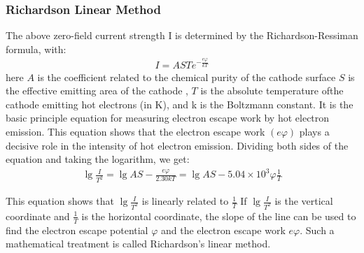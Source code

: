 \documentclass[UTF8]{article}
\begin{document}
   \subsubsection{Richardson Linear Method}
   The above zero-field current strength I is determined by the Richardson-Ressiman formula, with:
   \begin{eqnarray}
   I=A S T e^{-\frac{e \varphi}{k T}}
   \end{eqnarray}
   here $A$ is the coefficient related to the chemical purity of the cathode surface  $S$ is the effective emitting area of the cathode , $T$ is the absolute temperature ofthe cathode emitting hot electrons (in K), and k is the Boltzmann constant. It is the basic principle equation for measuring electron escape work by hot electron emission. This equation shows that the electron escape work $( e\varphi )$ plays a decisive role in the intensity of hot electron emission. Dividing both sides of the equation and taking the logarithm, we get:
   \begin{eqnarray}
   \lg \frac{I}{T^{2}}=\lg A S-\frac{e \varphi}{2.30 k T}=\lg A S-5.04 \times 10^{3} \varphi \frac{1}{T}
   \end{eqnarray}
   
   This equation shows that $\lg \frac{I}{T^{2}}$ is linearly related to $\frac{1}{T}$ If $\lg \frac{I}{T^{2}}$  is the vertical coordinate and $\frac{1}{T}$  is the horizontal coordinate, the slope of the line can be used to find the electron escape potential $\varphi$ and the electron escape work $e\varphi$. Such a mathematical treatment is called Richardson's linear method.
   
\end{document}
